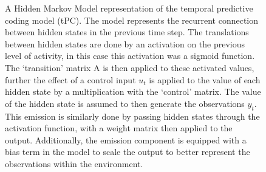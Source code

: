 \documentclass{article}
\begin{document}
\begin{figure}[h]
    \centering
    \caption{A Hidden Markov Model representation of the temporal predictive coding model (tPC). The model represents the recurrent connection between hidden states in the previous time step. The translations between hidden states are done by an activation on the previous level of activity, in this case this activation was a sigmoid function. The `transition' matrix A is then applied to these activated values, further the effect of a control input $u_t$ is applied to the value of each hidden state by a multiplication with the `control' matrix. The value of the hidden state is assumed to then generate the observations $y_t$. This emission is similarly done by passing hidden states through the activation function, with a weight matrix then applied to the output. Additionally, the emission component is equipped with a bias term in the model to scale the output to better represent the observations within the environment.}
    \label{fig:hmm}
\end{figure}
\end{document}
